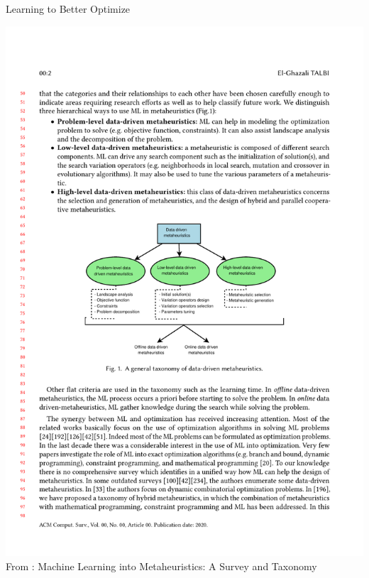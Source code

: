 \documentclass[aspectratio=1610]{beamer}
\newcommand{\important}[1]{{\color{green!60!black}#1}}
\renewcommand{\footnotesize}{\scriptsize}
\begin{document}
\begin{frame}{Learning to Better Optimize}
	\begin{center}
		\includegraphics[width=0.75\linewidth]{figures/talbi-data-driven-mhs}\\[2ex]
		\footnotesize{From \citet{talbi-21}: Machine Learning into Metaheuristics: A Survey and Taxonomy}
	\end{center}
\end{frame}



		
\end{document}
